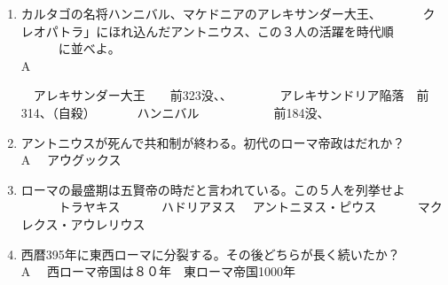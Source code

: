 \documentclass[fleqn]{article}
\begin{document}
\begin{enumerate}
\item{
カルタゴの名将ハンニバル、マケドニアのアレキサンダー大王、
　　　クレオパトラ」にほれ込んだアントニウス、この３人の活躍を時代順
　　　に並べよ。\\
\vspace{1zw}A 

　アレキサンダー大王　　前323没、、　
　　　アレキサンドリア陥落　前314、（自殺）
　　　ハンニバル　　　　　　前184没、
}
\item{アントニウスが死んで共和制が終わる。初代のローマ帝政はだれか？\\
\vspace{1zw}A 　アウグックス
}
\item{
 ローマの最盛期は五賢帝の時だと言われている。この５人を列挙せよ\\　　　トラヤキス
　　　ハドリアヌス
	　アントニヌス・ピウス
　　　マクレクス・アウレリウス
}
\item{
西暦395年に東西ローマに分裂する。その後どちらが長く続いたか？\\
\vspace{1zw}A 　西ローマ帝国は８０年　東ローマ帝国1000年
}


\end{enumerate}
\end{document}
